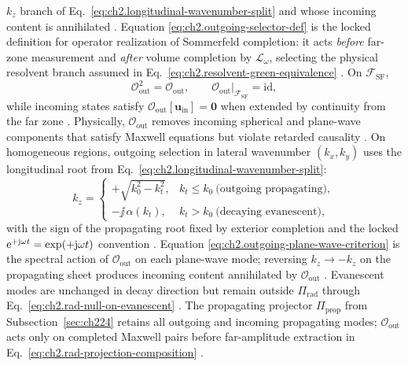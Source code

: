 \(k_z\) branch of Eq.~\eqref{eq:ch2.longitudinal-wavenumber-split} and whose
incoming content is annihilated \cite{stratton1941}. Equation
\eqref{eq:ch2.outgoing-selector-def} is the locked definition for operator
realization of Sommerfeld completion: it acts \emph{before} far-zone measurement and
\emph{after} volume completion by \(\mathcal{L}_\omega\), selecting the physical
resolvent branch assumed in Eq.~\eqref{eq:ch2.resolvent-green-equivalence}
\cite{stratton1941}. On \(\mathcal{F}_{\mathrm{SF}}\),
\begin{equation}
\label{eq:ch2.outgoing-idempotency}
\mathcal{O}_{\mathrm{out}}^2=\mathcal{O}_{\mathrm{out}},
\qquad
\mathcal{O}_{\mathrm{out}}\big|_{\mathcal{F}_{\mathrm{SF}}}=\mathrm{id},
\end{equation}
while incoming states satisfy \(\mathcal{O}_{\mathrm{out}}[\mathbf{u}_{\mathrm{in}}]=\mathbf{0}\)
when extended by continuity from the far zone \cite{harrington2001}. Physically,
\(\mathcal{O}_{\mathrm{out}}\) removes incoming spherical and plane-wave components
that satisfy Maxwell equations but violate retarded causality
\cite{jackson1999}.
On homogeneous regions, outgoing selection in lateral wavenumber \((k_x,k_y)\) uses
the longitudinal root from Eq.~\eqref{eq:ch2.longitudinal-wavenumber-split}:
\begin{equation}
\label{eq:ch2.outgoing-plane-wave-criterion}
k_z=
\begin{cases}
+\sqrt{k_0^2-k_t^2}, & k_t\le k_0\ \text{(outgoing propagating)},\\[4pt]
-\jj\,\alpha(k_t), & k_t>k_0\ \text{(decaying evanescent)},
\end{cases}
\end{equation}
with the sign of the propagating root fixed by exterior completion and the locked
\(\mathrm{e}^{+\mathrm{j}\omega t}=\exp(+\mathrm{j}\omega t)\) convention \cite{stratton1941}. Equation
\eqref{eq:ch2.outgoing-plane-wave-criterion} is the spectral action of
\(\mathcal{O}_{\mathrm{out}}\) on each plane-wave mode; reversing
\(k_z\to -k_z\) on the propagating sheet produces incoming content annihilated by
\(\mathcal{O}_{\mathrm{out}}\) \cite{stratton1941}. Evanescent modes are unchanged
in decay direction but remain outside \(\Pi_{\mathrm{rad}}\) through
Eq.~\eqref{eq:ch2.rad-null-on-evanescent} \cite{harrington2001}. The propagating
projector \(\Pi_{\mathrm{prop}}\) from Subsection~\ref{sec:ch224} retains all
outgoing and incoming propagating modes; \(\mathcal{O}_{\mathrm{out}}\) acts only
on completed Maxwell pairs before far-amplitude extraction in
Eq.~\eqref{eq:ch2.rad-projection-composition} \cite{stratton1941}.
